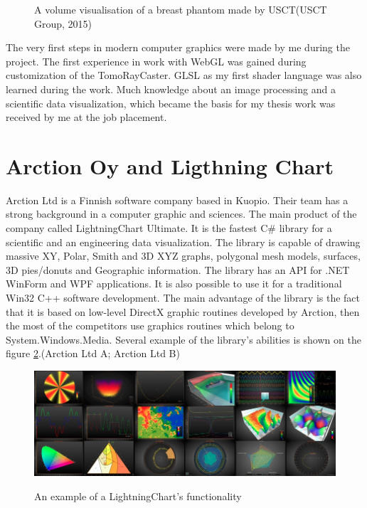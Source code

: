 \documentclass[twoside, english, 11pt]{report}
\begin{document}
\begin{figure}[!h]
\caption{A volume visualisation of a breast phantom made by USCT(USCT Group, 2015)\label{fig:usct}}
\end{figure}

The very first steps in modern computer graphics were made by me during the project. The first experience in work with WebGL was gained during customization of the TomoRayCaster. GLSL as my first shader language was also learned during the work. Much knowledge about an image processing and a scientific data visualization, which became the basis for my thesis work was received by me at the job placement.


\section{Arction Oy and Ligthning Chart}

Arction Ltd is a Finnish software company based in Kuopio. Their team has a strong background in a computer graphic and sciences. The main product of the company called LightningChart Ultimate. It is the fastest C\# library for a scientific and an engineering data visualization. The library is capable of drawing massive XY, Polar, Smith and 3D XYZ graphs, polygonal mesh models, surfaces, 3D pies/donuts and Geographic information. The library has an API for .NET WinForm and WPF applications. It is also possible to use it for a traditional Win32 C++ software development. The main advantage of the library is the fact that it is based on low-level DirectX graphic routines developed by Arction, then the most of the competitors use graphics routines which belong to System.Windows.Media. Several example of the library's abilities is shown on the figure \ref{fig:lchu}.(Arction Ltd A; Arction Ltd B)\\
\begin{figure}[!h]
\includegraphics[scale=0.5]{img/lchu}\\
\caption{An example of a LightningChart's functionality\label{fig:lchu}}
\end{figure}
\end{document}
